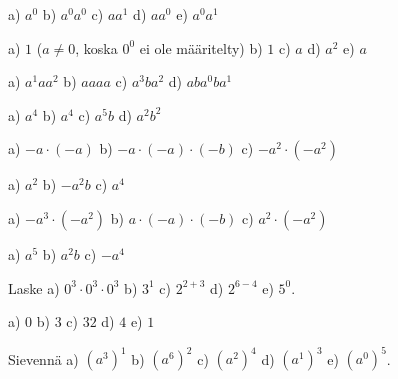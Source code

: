 \begin{tehtavasivu}
    \begin{tehtava}
        a) $a^0$ \qquad
        b) $a^0a^0$ \qquad
        c) $a a^1$ \qquad
        d) $aa^0$ \qquad
        e) $a^0a^1$
        
        \begin{vastaus}
            a) $1$ \quad ($a\neq0$, koska $0^0$ ei ole määritelty) \qquad
            b) $1$ \qquad
            c) $a$ \qquad
            d) $a^2$ \qquad
            e) $a$
        \end{vastaus}
    \end{tehtava}
    
    \begin{tehtava}
        a) $a^1 a a^2$ \qquad
        b) $aaaa$ \qquad
        c) $a^3ba^2$ \qquad
        d) $aba^0ba^1$
        
        \begin{vastaus}
            a) $ a^4$ \qquad
            b) $a^4$ \qquad
            c) $a^5b$ \qquad
            d) $a^2b^2$
        \end{vastaus}
    \end{tehtava}
       

    \begin{tehtava}
        a) $-a\cdot(-a)$ \qquad
        b) $-a\cdot(-a)\cdot(-b)$ \qquad
        c) $-a^2\cdot(-a^2)$
    
        \begin{vastaus}
            a) $a^2$ \qquad
            b) $-a^2b$ \qquad
            c) $a^4$
        \end{vastaus}
    \end{tehtava}

    \begin{tehtava}
        a) $-a^3\cdot(-a^2)$ \qquad
        b) $a\cdot(-a)\cdot(-b)$ \qquad
        c) $a^2\cdot(-a^2)$
        
        \begin{vastaus}
            a) $a^5$ \qquad
            b) $a^2b$ \qquad
            c) $-a^4$
        \end{vastaus}
    \end{tehtava}

    \begin{tehtava}
        Laske
        a) $0^3\cdot0^3\cdot0^3$ \qquad
        b) $3^1$ \qquad
        c) $2^{2+3}$ \qquad
        d) $2^{6-4}$ \qquad
        e) $5^0$.

        \begin{vastaus}
            a) $0$ \qquad
            b) $3$ \qquad
            c) $32$ \qquad
            d) $4$ \qquad
            e) $1$
        \end{vastaus}
    \end{tehtava}
    \begin{tehtava}
        Sievennä \quad
        a) $(a^3)^1$ \qquad
        b) $(a^6)^2$ \qquad
        c) $(a^2)^4$ \qquad 
        d) $(a^1)^3$ \qquad
        e) $(a^0)^5$.


\end{tehtava}
\end{tehtavasivu}
